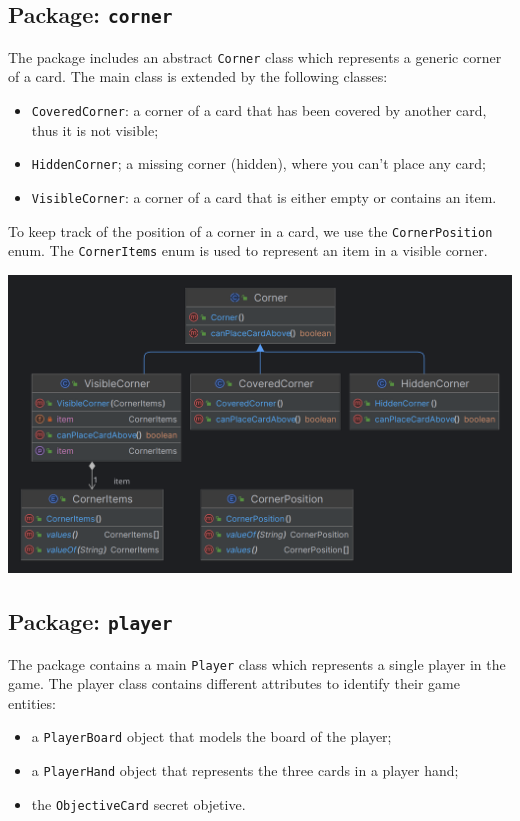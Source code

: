 \documentclass{article}
\begin{document}
\subsection{Package: \texttt{corner}}
The package includes an abstract \texttt{Corner} class which represents a generic corner of a card.
The main class is extended by the following classes:
\begin{itemize}
    \item \texttt{CoveredCorner}: a corner of a card that has been covered by another card, thus it is not visible;
    \item \texttt{HiddenCorner}; a missing corner (hidden), where you can't place any card;
    \item \texttt{VisibleCorner}: a corner of a card that is either empty or contains an item.
\end{itemize}
To keep track of the position of a corner in a card, we use the \texttt{CornerPosition} enum.
\noindent
The \texttt{CornerItems} enum is used to represent an item in a visible corner.
\begin{center}
    \hspace*{-2cm}\includegraphics[scale=0.3]{corner.png}
\end{center}

\newpage
\subsection{Package: \texttt{player}}
The package contains a main \texttt{Player} class which represents a single player in the game.
The player class contains different attributes to identify their game entities:
\begin{itemize}
    \item a \texttt{PlayerBoard} object that models the board of the player;
    \item a \texttt{PlayerHand} object that represents the three cards in a player hand;
    \item the \texttt{ObjectiveCard} secret objetive.
\end{itemize}
\end{document}
